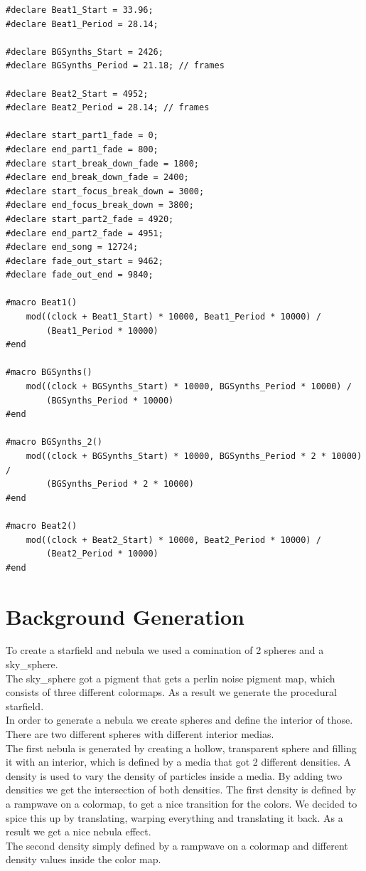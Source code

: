 \documentclass[a4paper, 12pt]{scrartcl}
\begin{document}
    \begin{verbatim}
#declare Beat1_Start = 33.96;
#declare Beat1_Period = 28.14;

#declare BGSynths_Start = 2426;
#declare BGSynths_Period = 21.18; // frames

#declare Beat2_Start = 4952;
#declare Beat2_Period = 28.14; // frames

#declare start_part1_fade = 0;
#declare end_part1_fade = 800;
#declare start_break_down_fade = 1800;
#declare end_break_down_fade = 2400;
#declare start_focus_break_down = 3000;
#declare end_focus_break_down = 3800;
#declare start_part2_fade = 4920;
#declare end_part2_fade = 4951;
#declare end_song = 12724;
#declare fade_out_start = 9462;
#declare fade_out_end = 9840;

#macro Beat1()
    mod((clock + Beat1_Start) * 10000, Beat1_Period * 10000) /
        (Beat1_Period * 10000)
#end

#macro BGSynths()
    mod((clock + BGSynths_Start) * 10000, BGSynths_Period * 10000) /
        (BGSynths_Period * 10000)
#end

#macro BGSynths_2()
    mod((clock + BGSynths_Start) * 10000, BGSynths_Period * 2 * 10000) /
        (BGSynths_Period * 2 * 10000)
#end

#macro Beat2()
    mod((clock + Beat2_Start) * 10000, Beat2_Period * 10000) /
        (Beat2_Period * 10000)
#end
    \end{verbatim}

    \section{Background Generation}

    To create a starfield and nebula we used a comination of 2 spheres and a sky\_sphere. \\ 
    The sky\_sphere got a pigment that gets a perlin noise pigment map, which consists of three different colormaps. As a result we generate the procedural starfield. \\
    In order to generate a nebula we create spheres and define the interior of those. There are two different spheres with different interior medias. \\
    The first nebula is generated by creating a hollow, transparent sphere and filling it with an interior, which is defined by a media that got 2 different densities. A density is used to vary the density of particles inside a media.
    By adding two densities we get the intersection of both densities. The first density is defined by a rampwave on a colormap, to get a nice transition for the colors. We decided to spice this up by translating, warping everything and translating it back. As a result we get a nice nebula effect. \\
    The second density simply defined by a rampwave on a colormap and different density values inside the color map.
\end{document}
